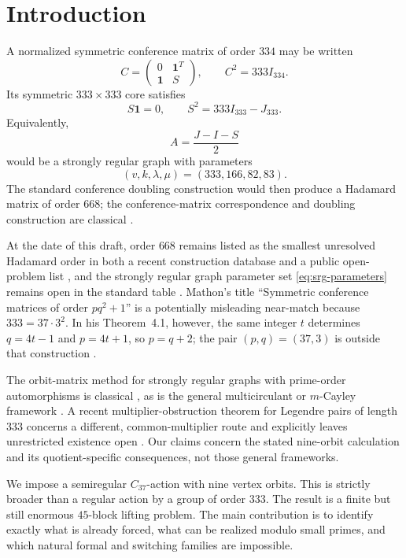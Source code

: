 \documentclass[11pt]{article}
\theoremstyle{definition}
\newcommand{\one}{\mathbf{1}}
\begin{document}
\section{Introduction}

A normalized symmetric conference matrix of order \(334\) may be written
\[
 C=
 \begin{pmatrix}
 0&\one^{T}\\
 \one&S
 \end{pmatrix},
 \qquad C^2=333I_{334}.
\]
Its symmetric \(333\times333\) core satisfies
\[
 S\one=0,\qquad S^2=333I_{333}-J_{333}.
 \tag{1.1}\label{eq:seidel-core}
\]
Equivalently,
\[
 A=\frac{J-I-S}{2}
\]
would be a strongly regular graph with parameters
\[
 (v,k,\lambda,\mu)=(333,166,82,83).
 \tag{1.2}\label{eq:srg-parameters}
\]
The standard conference doubling construction would then produce a
Hadamard matrix of order \(668\); the conference-matrix correspondence and
doubling construction are classical \cite{goethals-seidel}.

At the date of this draft, order \(668\) remains listed as the smallest
unresolved Hadamard order in both a recent construction database and a
public open-problem list \cite{cati-pasechnik,epoch-hadamard}, and the
strongly regular graph parameter set \eqref{eq:srg-parameters} remains open
in the standard table \cite{brouwer-srg}.  Mathon's title ``Symmetric
conference matrices of order \(pq^2+1\)'' is a potentially misleading
near-match because \(333=37\cdot3^2\).  In his Theorem~4.1, however, the
same integer \(t\) determines \(q=4t-1\) and \(p=4t+1\), so \(p=q+2\);
the pair \((p,q)=(37,3)\) is outside that construction \cite{mathon}.

The orbit-matrix method for strongly regular graphs with prime-order
automorphisms is classical \cite{behbahani-lam}, as is the general
multicirculant or \(m\)-Cayley framework \cite{martinez}.  A recent
multiplier-obstruction theorem for Legendre pairs of length \(333\)
concerns a different, common-multiplier route and explicitly leaves
unrestricted existence open \cite{ramos-hulak-queiroz}.  Our claims concern
the stated nine-orbit calculation and its quotient-specific consequences,
not those general frameworks.

We impose a semiregular \(C_{37}\)-action with nine vertex orbits.  This is
strictly broader than a regular action by a group of order \(333\).  The
result is a finite but still enormous \(45\)-block lifting problem.  The
main contribution is to identify exactly what is already forced, what can
be realized modulo small primes, and which natural formal and switching
families are impossible.
\end{document}
